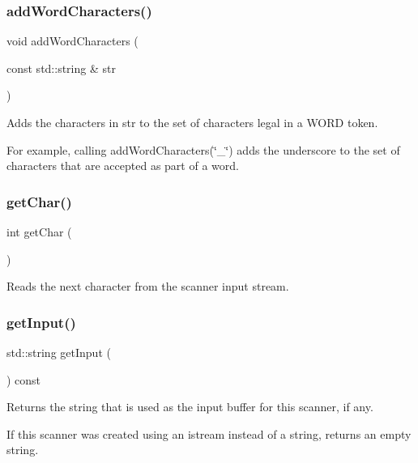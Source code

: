 \subsubsection{\texorpdfstring{add\+Word\+Characters()}{addWordCharacters()}}
{\footnotesize\ttfamily void add\+Word\+Characters (\begin{DoxyParamCaption}\item[{const std\+::string \&}]{str }\end{DoxyParamCaption})}



Adds the characters in {\ttfamily str} to the set of characters legal in a {\ttfamily W\+O\+RD} token. 

For example, calling {\ttfamily add\+Word\+Characters(\char`\"{}\+\_\+\char`\"{})} adds the underscore to the set of characters that are accepted as part of a word. \mbox{\label{classTokenScanner_aa1ac28f13062f093eb32a49dce4c63f8}} 
\subsubsection{\texorpdfstring{get\+Char()}{getChar()}}
{\footnotesize\ttfamily int get\+Char (\begin{DoxyParamCaption}{ }\end{DoxyParamCaption})}



Reads the next character from the scanner input stream. 

\mbox{\label{classTokenScanner_ae2c34694d98dc66a7493339061a4358e}} 
\subsubsection{\texorpdfstring{get\+Input()}{getInput()}}
{\footnotesize\ttfamily std\+::string get\+Input (\begin{DoxyParamCaption}{ }\end{DoxyParamCaption}) const}



Returns the string that is used as the input buffer for this scanner, if any. 

If this scanner was created using an istream instead of a string, returns an empty string. \mbox{\label{classTokenScanner_a6c9c9aa34f1ae28cd7a4f150e2df8201}} 
